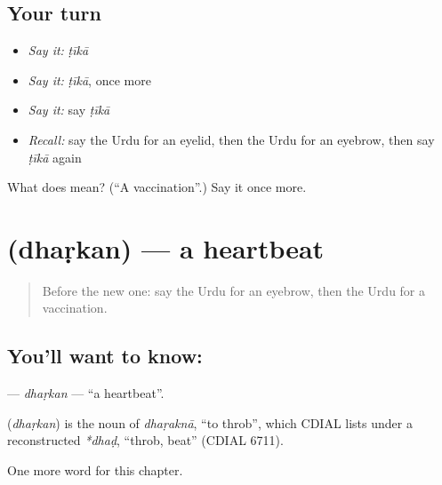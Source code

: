 \subsection*{Your turn}
\begin{itemize}
\raggedright
  \item \emph{Say it:} \emph{ṭīkā}
  \item \emph{Say it:} \emph{ṭīkā}, once more
  \item \emph{Say it:} say \emph{ṭīkā}
  \item \emph{Recall:} say the Urdu for an eyelid, then the Urdu for an eyebrow, then say \emph{ṭīkā} again
\end{itemize}

\begin{tcolorbox}[breakable,colback=teal!4,colframe=teal!35!black,title={Before you move on}]
What does  mean? (\textquotedblleft{}A vaccination\textquotedblright{}.) Say it once more.
\end{tcolorbox}
\section[\texorpdfstring{\ur{دھڑکن} (dhaṛkan)}{دھڑکن (dhaṛkan)}]{ (dhaṛkan) — a heartbeat}

\label{lesson:UR-C154-dharkan}



\begin{quote}
Before the new one: say the Urdu for an eyebrow, then the Urdu for a vaccination.
\end{quote}

\subsection*{You'll want to know: }
\textbf{} — \emph{dhaṛkan} — \textquotedblleft{}a heartbeat\textquotedblright{}.

\begin{cousinweb}
\textbf{} (\emph{dhaṛkan}) is the noun of \emph{dhaṛaknā}, \textquotedblleft{}to throb\textquotedblright{}, which CDIAL lists under a reconstructed \emph{*dhaḍ}, \textquotedblleft{}throb, beat\textquotedblright{} (CDIAL 6711).
\end{cousinweb}

\begin{grammarlens}[title={What you've built}]
One more word for this chapter.
\end{grammarlens}

